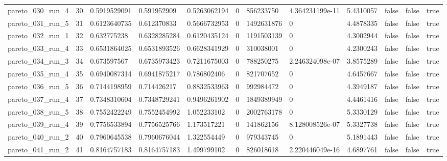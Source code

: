 \begin{tabular}{@{}llllllllllll@{}}
pareto\_030\_run\_4 & 30 & 0.5919529091 & 0.591952909 & 0.5263062194 & 0 & 856233750 & 4.364231199e-11 & 5.4310057 & false & false & true \\
pareto\_031\_run\_5 & 31 & 0.6123640735 & 0.612370833 & 0.5666732953 & 0 & 1492631876 & 0 & 4.4878335 & false & false & true \\
pareto\_032\_run\_1 & 32 & 0.632775238 & 0.6328285284 & 0.6120435124 & 0 & 1191503139 & 0 & 4.3002944 & false & false & true \\
pareto\_033\_run\_4 & 33 & 0.6531864025 & 0.6531893526 & 0.6628341929 & 0 & 310038001 & 0 & 4.2300243 & false & false & true \\
pareto\_034\_run\_3 & 34 & 0.673597567 & 0.6735973423 & 0.7211675003 & 0 & 788250275 & 2.246324098e-07 & 3.8575289 & false & false & true \\
pareto\_035\_run\_4 & 35 & 0.6940087314 & 0.6941875217 & 0.786802406 & 0 & 821707652 & 0 & 4.6457667 & false & false & true \\
pareto\_036\_run\_5 & 36 & 0.7144198959 & 0.714426217 & 0.8832533963 & 0 & 992984472 & 0 & 4.3949187 & false & false & true \\
pareto\_037\_run\_4 & 37 & 0.7348310604 & 0.7348729241 & 0.9496261902 & 0 & 1849389949 & 0 & 4.4461416 & false & false & true \\
pareto\_038\_run\_5 & 38 & 0.7552422249 & 0.7552454992 & 1.052233102 & 0 & 2002763178 & 0 & 5.3330129 & false & false & true \\
pareto\_039\_run\_4 & 39 & 0.7756533894 & 0.7756525766 & 1.173517221 & 0 & 141862156 & 8.128008526e-07 & 5.3327738 & false & false & true \\
pareto\_040\_run\_2 & 40 & 0.7960645538 & 0.7960676044 & 1.322554449 & 0 & 979343745 & 0 & 5.1891443 & false & false & true \\
pareto\_041\_run\_2 & 41 & 0.8164757183 & 0.8164757183 & 1.499799102 & 0 & 826018618 & 2.220446049e-16 & 4.6897761 & false & false & true \\
\bottomrule
\end{tabular}

